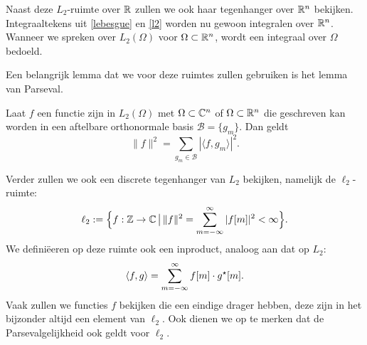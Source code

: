 Naast deze $L_2$-ruimte over $\mathbb{R}$ zullen we ook haar tegenhanger over $\mathbb{R}^n$ bekijken. Integraaltekens uit \eqref{lebesgue} en \eqref{l2} worden nu gewoon integralen over $\mathbb{R}^n$. Wanneer we spreken over $L_2(\Omega)$ voor $\Omega \subset \mathbb{R}^n$, wordt een integraal over $\Omega$ bedoeld.

Een belangrijk lemma dat we voor deze ruimtes zullen gebruiken is het lemma van Parseval.
\begin{lemm}
  \label{parseval}
  Laat $f$ een functie zijn in $L_2(\Omega)$ met $\Omega \subset \mathbb{C}^n$ of $\Omega\subset\mathbb{R}^n$ die geschreven kan worden in een aftelbare 
  orthonormale basis $\mathcal{B}=\{g_m\}$. Dan geldt
  \[
  \|f\|^2 = \sum_{g_m\in\mathcal{B}} | \langle f, g_m \rangle |^2.
  \]
\end{lemm}

Verder zullen we ook een discrete tegenhanger van $L_2$ bekijken, namelijk de $\ell_2$-ruimte:
\[
\ell_2 :=\Big \{f:\mathbb{Z} \to \mathbb{C} \,\big|\, \|f\|^2 = \sum_{m=-\infty}^\infty |f[m]|^2 < \infty \Big \}.
\]
We defini\"eeren op deze ruimte ook een inproduct, analoog aan dat op $L_2$:
\[
\langle f , g \rangle = \sum_{m=-\infty}^\infty f[m]\cdot g^\star[m].
\]
Vaak zullen we functies $f$ bekijken die een eindige drager hebben, deze zijn in het bijzonder altijd een element
van $\ell_2$. Ook dienen we op te merken dat de Parsevalgelijkheid ook geldt voor $\ell_2$.
